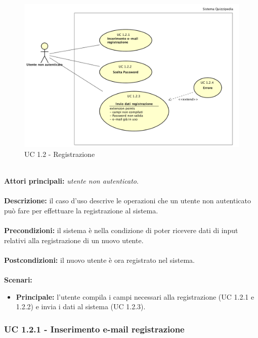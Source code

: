 \documentclass[a4paper,11pt]{article}
\begin{document}
\begin{figure}[h!]
\centering
\includegraphics[scale=0.4]{../immagini/UC1_2.png}
\caption{UC 1.2 - Registrazione}
\end{figure}
\ \\
\textbf{Attori principali:} \textit{utente non autenticato}.\\
\\
\textbf{Descrizione:} il caso d'uso descrive le operazioni che un utente non autenticato può fare per effettuare la registrazione al sistema. \\
\\
\textbf{Precondizioni:} il sistema è nella condizione di poter ricevere dati di input relativi alla registrazione di un nuovo utente.\\
\\
\textbf{Postcondizioni:} il nuovo utente è ora registrato nel sistema. \\
\\
\textbf{Scenari:}
\begin{itemize}
\item \textbf{Principale:} l'utente compila i campi necessari alla registrazione (UC 1.2.1 e 1.2.2) e invia i dati al sistema (UC 1.2.3).

\end{itemize}
\vspace{6 mm}
\subsubsection{UC 1.2.1 - Inserimento e-mail registrazione}
\end{document}
